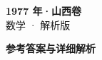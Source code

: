 \documentclass[zihao=-4, a4paper]{ctexart}
\begin{document}
\begin{center}
  {\Large\bfseries 1977 年·山西卷}\\[4pt]
  {\large 数学 · 解析版}
\end{center}
\medskip
{}

\clearpage
{}
\begin{center}{\Large\bfseries 参考答案与详细解析}\end{center}
\medskip

\end{document}
